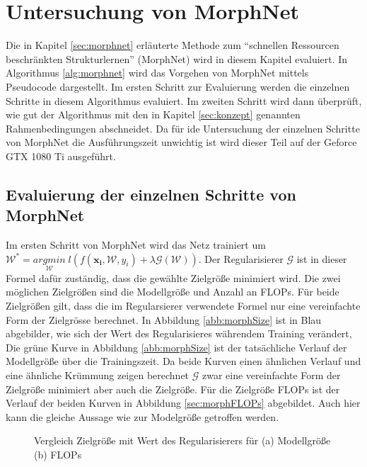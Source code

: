\chapter{Untersuchung von MorphNet}\label{sec:morphexperimente}
\color{blue1}

Die in Kapitel \ref{sec:morphnet} erläuterte Methode zum ``schnellen Ressourcen beschränkten Strukturlernen'' (MorphNet) wird in diesem Kapitel evaluiert. In Algorithmus \ref{alg:morphnet} wird das Vorgehen von MorphNet mittels Pseudocode dargestellt. Im ersten Schritt zur Evaluierung werden die einzelnen Schritte in diesem Algorithmus evaluiert. Im zweiten Schritt wird dann überprüft, wie gut der Algorithmus mit den in Kapitel \ref{sec:konzept} genannten Rahmenbedingungen abschneidet. Da für ide Untersuchung der einzelnen Schritte von MorphNet die Ausführungszeit unwichtig ist wird dieser Teil auf der Geforce GTX 1080 Ti ausgeführt.


\section{Evaluierung der einzelnen Schritte von MorphNet}
Im ersten Schritt von MorphNet wird das Netz trainiert um $\mathcal{W}^{\ast}=\underset{\mathcal{W}}{arg min}\; l(f(\mathbf{x_i}, \mathcal{W},y_i) + \lambda \mathcal{G}(\mathcal{W}))$. Der Regularisierer $\mathcal{G}$ ist in dieser Formel dafür zuständig, dass die gewählte Zielgröße minimiert wird. Die zwei möglichen Zielgrößen sind die Modellgröße und Anzahl an FLOPs. Für beide Zielgrößen gilt, dass die im Regularsierer verwendete Formel nur eine vereinfachte Form der Zielgrösse berechnet. In Abbildung \ref{abb:morphSize} ist in Blau abgebilder, wie sich der Wert des Regularisieres währendem Training verändert, Die grüne Kurve in Abbildung \ref{abb:morphSize} ist der tatsächliche Verlauf der Modellgröße über die Trainingszeit. Da beide Kurven einen ähnlichen Verlauf und eine ähnliche Krümmung zeigen berechnet $\mathcal{G}$ zwar eine vereinfachte Form der Zielgröße minimiert aber auch die Zielgröße. 
Für die Zielgröße FLOPs ist der Verlauf der beiden Kurven in Abbildung \ref{sec:morphFLOPs} abgebildet. Auch hier kann die gleiche Aussage wie zur Modelgröße getroffen werden.

\begin{figure}
     \centering
     \hfill
     \caption{Vergleich Zielgröße mit Wert des Regularisierers für (a) Modellgröße (b) FLOPs}
     \label{abb:morph1}
\end{figure}



